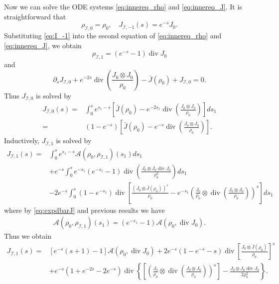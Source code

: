 \documentclass[english]{amsart}
\theoremstyle{plain}
\theoremstyle{definition}
\theoremstyle{remark}
\theoremstyle{plain}
\theoremstyle{plain}
\theoremstyle{plain}
\def\d{{\partial}}
\DeclareMathOperator{\diver}{div}
\numberwithin{equation}{section}
\begin{document}
Now we can solve the ODE systems \eqref{eq:innereq_rho} and \eqref{eq:innereq_J}. It is straightforward that
\begin{equation}\label{eq:I_-1}
\rho_{\mathcal{I},0}=\rho_0,\quad J_{\mathcal{I},-1}(s)=e^{-s}J_0.
\end{equation}
Substituting \eqref{eq:I_-1} into the second equation of \eqref{eq:innereq_rho} and \eqref{eq:innereq_J}, we obtain
\begin{equation}\label{eq:rho_I1}
\rho_{\mathcal{I},1}=(e^{-s}-1)\diver J_0
\end{equation}
and
\[
\d_sJ_{\mathcal{I},0}+e^{-2s}\diver\left(\frac{J_0\otimes J_0}{\rho_0}\right)-\bar J(\rho_0)+J_{\mathcal{I},0}=0.
\]
Thus $J_{\mathcal{I},0}$ is solved by
\begin{equation}\label{eq:J_I0}
\begin{aligned}
J_{\mathcal{I},0}(s)=&\int_0^s e^{s_1-s}\left[\bar J(\rho_0)-e^{-2s_1}\diver\left(\frac{J_0\otimes J_0}{\rho_0}\right)\right]ds_1\\
=&(1-e^{-s})\left[\bar J(\rho_0)-e^{-s}\diver\left(\frac{J_0\otimes J_0}{\rho_0}\right)\right].
\end{aligned}
\end{equation}
Inductively, $J_{\mathcal{I},1}$ is solved by
\begin{align*}
J_{\mathcal{I},1}(s)=&\int_0^s e^{s_1-s}\mathcal{A}(\rho_0,\rho_{\mathcal{I},1})(s_1)ds_1\\
&+e^{-s}\int_0^s e^{-s_1}(e^{-s_1}-1)\diver\left(\frac{J_0\otimes J_0\diver J_0}{\rho_0^2} \right)ds_1\\
&-2e^{-s}\int_0^s(1-e^{-s_1})\diver\left[\frac{(J_0\otimes\bar J(\rho_0))^s}{\rho_0}-e^{-s_1}\left(\frac{J_0}{\rho_0}\otimes\diver\left(\frac{J_0\otimes J_0}{\rho_0}\right)\right)^s\right]ds_1
\end{align*}
where by \eqref{eq:expdbarJ} and previous results we have
\begin{align*}
\mathcal{A}(\rho_0,\rho_{\mathcal{I},1})(s_1)=(e^{-s_1}-1)\mathcal{A}(\rho_0,\diver J_0).
\end{align*}
Thus we obtain
\begin{equation}\label{eq:J_I1}
\begin{aligned}
J_{\mathcal{I},1}(s)=&[e^{-s}(s+1)-1]\mathcal{A}(\rho_0,\diver J_0)+2e^{-s}(1-e^{-s}-s)\diver \left[\frac{J_0\otimes\bar J(\rho_0)}{\rho_0}\right]^s\\
&+e^{-s}(1+e^{-2s}-2e^{-s})\diver\left\{\left[\left(\frac{J_0}{\rho_0}\otimes\diver\left(\frac{J_0\otimes J_0}{\rho_0}\right)\right)^s\right]-\frac{J_0\otimes J_0\diver J_0}{2\rho_0^2}\right\}.
\end{aligned}
\end{equation}
\end{document}
